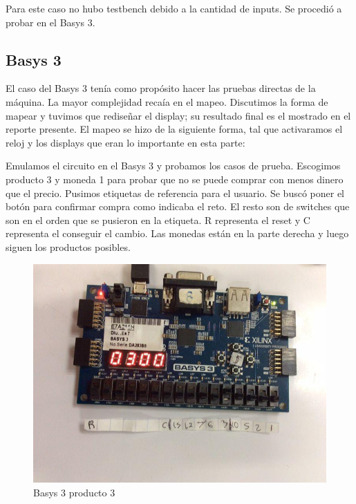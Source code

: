 \documentclass[12pt]{article}  %
\begin{document}


Para este caso no hubo testbench debido a la cantidad de inputs. Se procedió a probar en el Basys 3.

\subsection{Basys 3}
El caso del Basys 3 tenía como propósito hacer las pruebas directas de la máquina. La mayor complejidad recaía en el mapeo. Discutimos la forma de mapear y tuvimos que rediseñar el display; su resultado final es el mostrado en el reporte presente. El mapeo se hizo de la siguiente forma, tal que activaramos el reloj y los displays que eran lo importante en esta parte:



Emulamos el circuito en el Basys 3 y probamos los casos de prueba. Escogimos producto 3 y moneda 1 para probar que no se puede comprar con menos dinero que el precio. Pusimos etiquetas de referencia para el usuario. Se buscó poner el botón para confirmar compra como indicaba el reto. El resto son de switches que son en el orden que se pusieron en la etiqueta. R representa el reset y C representa el conseguir el cambio. Las monedas están en la parte derecha y luego siguen los productos posibles.

\begin{figure}[!ht]
  \centering
  \caption{Basys 3 producto 3}
  \includegraphics[width=0.75\linewidth]{Imagenes/Basys/product3.png}
\end{figure}

\newpage
\end{document}
